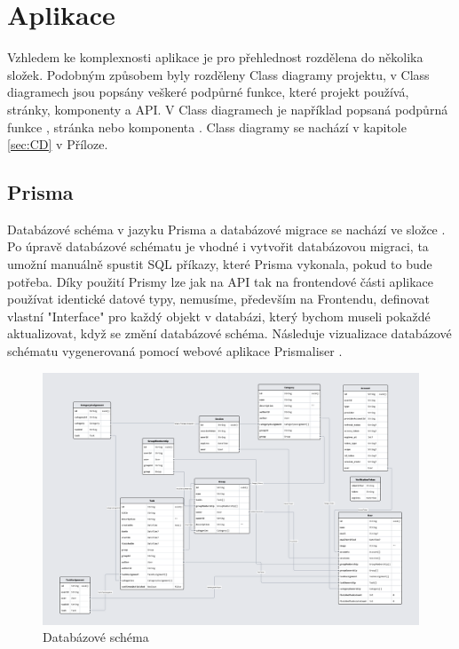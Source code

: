 \chapter{Aplikace}

Vzhledem ke komplexnosti aplikace je pro přehlednost rozdělena do několika složek. Podobným způsobem byly rozděleny Class diagramy projektu, v Class diagramech jsou popsány veškeré podpůrné funkce, které projekt používá, stránky, komponenty a API. V Class diagramech je například popsaná podpůrná funkce , stránka  nebo komponenta . Class diagramy se nachází v kapitole \ref{sec:CD} v Příloze. 
\section{Prisma}
\label{sec:prisma}

Databázové schéma v jazyku Prisma a databázové migrace se nachází ve složce . Po úpravě databázové schématu je vhodné i vytvořit databázovou migraci, ta umožní manuálně spustit SQL příkazy, které Prisma vykonala, pokud to bude potřeba. Díky použití Prismy lze jak na API tak na frontendové části aplikace používat identické datové typy, nemusíme, především na Frontendu, definovat vlastní "Interface" pro každý objekt v databázi, který bychom museli pokaždé aktualizovat, když se změní databázové schéma.
Následuje vizualizace databázové schématu vygenerovaná pomocí webové aplikace Prismaliser \cite{prismaliser}.

\begin{landscape}
\begin{figure}[hbt]
	\includegraphics[width=1\linewidth]{img/DB_schema.png}
	\caption{Databázové schéma}
\end{figure}
\end{landscape}
